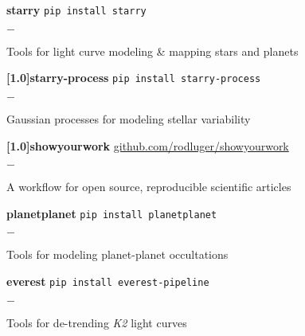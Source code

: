 \documentclass[]{luger-cv} %
\begin{document}
\begin{entrylist}


    \entry
    {\textbf{starry}}
    {\textnormal{\texttt{pip install starry}}}
    {}
    {%
        \vspace{-1em}
        \begin{list}{{\color{numcolor}$-$}}{\cvlist}
            \item Tools for light curve modeling \& mapping stars and planets
        \end{list}
    }


    \entry
    {\textbf{\scalebox{.85}[1.0]{starry-process}}}
    {\textnormal{\texttt{pip install starry-process}}}
    {}
    {%
        \vspace{-1em}
        \begin{list}{{\color{numcolor}$-$}}{\cvlist}
            \item Gaussian processes for modeling stellar variability
        \end{list}
    }

    
    \entry
    {\textbf{\scalebox{.85}[1.0]{showyourwork}}}
    {\textnormal{\url{github.com/rodluger/showyourwork}}}
    {}
    {%
        \vspace{-1em}
        \begin{list}{{\color{numcolor}$-$}}{\cvlist}
            \item A workflow for open source, reproducible scientific articles
        \end{list}
    }


    \entry
    {\textbf{planetplanet}}
    {\textnormal{\texttt{pip install planetplanet}}}
    {}
    {%
        \vspace{-1em}
        \begin{list}{{\color{numcolor}$-$}}{\cvlist}
            \item Tools for modeling planet-planet occultations
        \end{list}
    }


    \entry
    {\textbf{everest}}
    {\textnormal{\texttt{pip install everest-pipeline}}}
    {}
    {%
        \vspace{-1em}
        \begin{list}{{\color{numcolor}$-$}}{\cvlist}
            \item Tools for de-trending \emph{K2} light curves\\[-0.5em]
        \end{list}
    }


\end{entrylist}
\end{document}
